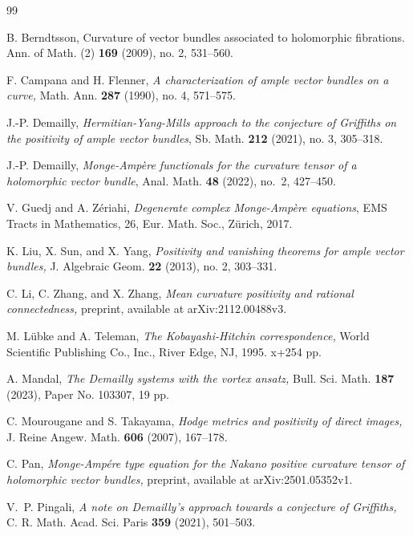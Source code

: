 \documentclass[a4, 12pt, 
]{amsart}
\numberwithin{equation}{section}
\theoremstyle{plain}
\theoremstyle{definition}
\theoremstyle{remark}
\begin{document}
\begin{thebibliography}{99}

 B. Berndtsson, Curvature of vector bundles associated to holomorphic fibrations. Ann. of Math. (2) \textbf{169} (2009), no. 2, 531--560.

 F. Campana and H. Flenner, 
 \textit{A characterization of ample vector bundles on a curve,} 
 Math. Ann. \textbf{287} (1990), no. 4, 571--575. 

 J.-P. Demailly, 
 \textit{Hermitian-Yang-Mills approach to the conjecture of Griffiths on the positivity of ample vector bundles}, 
 Sb. Math. \textbf{212} (2021), no. 3, 305--318.

 J.-P. Demailly, 
 \textit{Monge-Amp\`ere functionals for the curvature tensor of a holomorphic vector bundle}, Anal. Math. {\bf 48} (2022), no.~2, 427--450.

 V. Guedj and A. Z\'eriahi, {\it Degenerate complex Monge-Amp\`ere equations}, EMS Tracts in Mathematics, 26, Eur. Math. Soc., Z\"urich, 2017.

 K. Liu, X. Sun, and X. Yang, 
 \textit{Positivity and vanishing theorems for ample vector bundles,} J. Algebraic Geom. \textbf{22} (2013), no. 2, 303--331.

 C. Li, C. Zhang, and X. Zhang,
 \textit{Mean curvature positivity and rational connectedness,}
 preprint, available at arXiv:2112.00488v3. 

 M. Lübke and A. Teleman, 
 \textit{The Kobayashi-Hitchin correspondence,} 
 World Scientific Publishing Co., Inc., River Edge, NJ, 1995. {\rm x}+254 pp.

 A. Mandal, 
 \textit{The Demailly systems with the vortex ansatz,}
 Bull. Sci. Math. \textbf{187} (2023), Paper No. 103307, 19 pp.

 C. Mourougane and S. Takayama, 
 \textit{Hodge metrics and positivity of direct images,} 
 J. Reine Angew. Math. \textbf{606} (2007), 167--178.

 C. Pan, \textit{Monge-Ampére type equation for the Nakano positive curvature tensor of holomorphic vector bundles,}
 preprint, available at arXiv:2501.05352v1.

 V.~P. Pingali, 
 \textit{A note on Demailly's approach towards a conjecture of Griffiths,} C. R. Math. Acad. Sci. Paris {\bf 359} (2021), 501--503.


\end{thebibliography}
\end{document}
